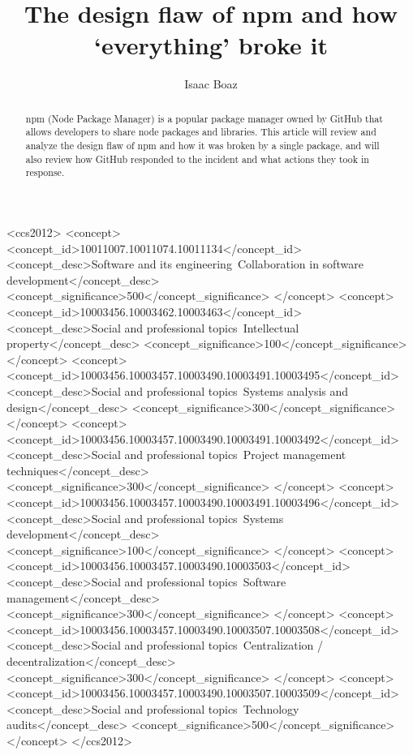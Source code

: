 \documentclass[acmsmall]{acmart}
\begin{document}
\title{The design flaw of npm and how `everything' broke it}

\author{Isaac Boaz}

\renewcommand{\shortauthors}{Boaz}

\begin{abstract}
  npm (Node Package Manager) is a popular package manager owned by GitHub that
  allows developers to share node packages and libraries. This article will
  review and analyze the design flaw of npm and how it was broken by a single
  package, and will also review how GitHub responded to the incident and what
  actions they took in response.
\end{abstract}


\begin{CCSXML}
  <ccs2012> <concept> <concept_id>10011007.10011074.10011134</concept_id>
  <concept_desc>Software and its engineering~Collaboration in software
  development</concept_desc> <concept_significance>500</concept_significance>
  </concept> <concept> <concept_id>10003456.10003462.10003463</concept_id>
  <concept_desc>Social and professional topics~Intellectual
  property</concept_desc> <concept_significance>100</concept_significance>
  </concept> <concept>
  <concept_id>10003456.10003457.10003490.10003491.10003495</concept_id>
  <concept_desc>Social and professional topics~Systems analysis and
  design</concept_desc> <concept_significance>300</concept_significance>
  </concept> <concept>
  <concept_id>10003456.10003457.10003490.10003491.10003492</concept_id>
  <concept_desc>Social and professional topics~Project management
  techniques</concept_desc> <concept_significance>300</concept_significance>
  </concept> <concept>
  <concept_id>10003456.10003457.10003490.10003491.10003496</concept_id>
  <concept_desc>Social and professional topics~Systems
  development</concept_desc> <concept_significance>100</concept_significance>
  </concept> <concept>
  <concept_id>10003456.10003457.10003490.10003503</concept_id>
  <concept_desc>Social and professional topics~Software
  management</concept_desc> <concept_significance>300</concept_significance>
  </concept> <concept>
  <concept_id>10003456.10003457.10003490.10003507.10003508</concept_id>
  <concept_desc>Social and professional topics~Centralization /
  decentralization</concept_desc>
  <concept_significance>300</concept_significance> </concept> <concept>
  <concept_id>10003456.10003457.10003490.10003507.10003509</concept_id>
  <concept_desc>Social and professional topics~Technology audits</concept_desc>
  <concept_significance>500</concept_significance> </concept> </ccs2012>
\end{CCSXML}
\end{document}
